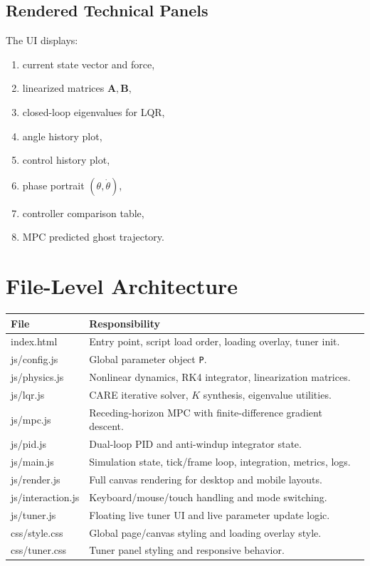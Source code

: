 \documentclass[11pt,a4paper]{article}
\newcommand{\A}{\mathbf{A}}
\newcommand{\B}{\mathbf{B}}
\begin{document}
\subsection{Rendered Technical Panels}
The UI displays:
\begin{enumerate}[label=\arabic*.]
  \item current state vector and force,
  \item linearized matrices $\A,\B$,
  \item closed-loop eigenvalues for LQR,
  \item angle history plot,
  \item control history plot,
  \item phase portrait $(\theta,\dot{\theta})$,
  \item controller comparison table,
  \item MPC predicted ghost trajectory.
\end{enumerate}

\section{File-Level Architecture}
\begin{center}
\begin{tabular}{>{\ttfamily}p{3.4cm} p{10.2cm}}
\toprule
File & Responsibility \\
\midrule
index.html & Entry point, script load order, loading overlay, tuner init. \\
js/config.js & Global parameter object \texttt{P}. \\
js/physics.js & Nonlinear dynamics, RK4 integrator, linearization matrices. \\
js/lqr.js & CARE iterative solver, $K$ synthesis, eigenvalue utilities. \\
js/mpc.js & Receding-horizon MPC with finite-difference gradient descent. \\
js/pid.js & Dual-loop PID and anti-windup integrator state. \\
js/main.js & Simulation state, tick/frame loop, integration, metrics, logs. \\
js/render.js & Full canvas rendering for desktop and mobile layouts. \\
js/interaction.js & Keyboard/mouse/touch handling and mode switching. \\
js/tuner.js & Floating live tuner UI and live parameter update logic. \\
css/style.css & Global page/canvas styling and loading overlay style. \\
css/tuner.css & Tuner panel styling and responsive behavior. \\
\bottomrule
\end{tabular}
\end{center}
\end{document}
